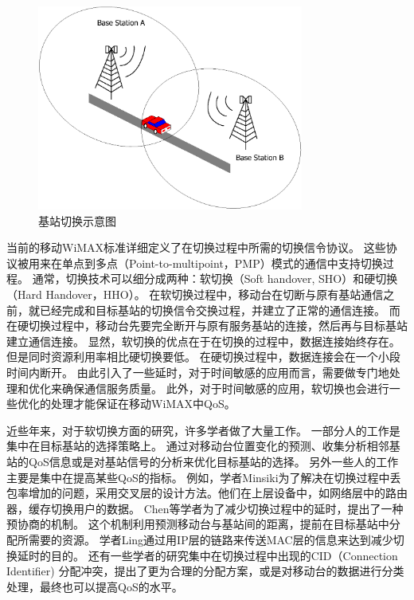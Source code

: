 \begin{figure}[t]
\begin{centering}
\includegraphics[height=6.75cm]{../figures/iccs_handover_bs}
\caption{基站切换示意图}
\label{fig:chap_iccs_handover_bs}
\end{centering}
\end{figure}

当前的移动WiMAX标准详细定义了在切换过程中所需的切换信令协议。
这些协议被用来在单点到多点（Point-to-multipoint，PMP）模式的通信中支持切换过程。
通常，切换技术可以细分成两种：软切换（Soft handover, SHO）和硬切换（Hard Handover，HHO）。
在软切换过程中，移动台在切断与原有基站通信之前，就已经完成和目标基站的切换信令交换过程，并建立了正常的通信连接。
而在硬切换过程中，移动台先要完全断开与原有服务基站的连接，然后再与目标基站建立通信连接。
显然，软切换的优点在于在切换的过程中，数据连接始终存在。
但是同时资源利用率相比硬切换要低。
在硬切换过程中，数据连接会在一个小段时间内断开。
由此引入了一些延时，对于时间敏感的应用而言，需要做专门地处理和优化来确保通信服务质量。
此外，对于时间敏感的应用，软切换也会进行一些优化的处理才能保证在移动WiMAX中QoS。


近些年来，对于软切换方面的研究，许多学者做了大量工作。
一部分人的工作是集中在目标基站的选择策略上。
通过对移动台位置变化的预测、收集分析相邻基站的QoS信息或是对基站信号的分析来优化目标基站的选择\cite{Hsieh:INFOCOM2003}\cite{DooHwan:WPC2006}。
另外一些人的工作主要是集中在提高某些QoS的指标。
例如，学者Minsiki为了解决在切换过程中丢包率增加的问题，采用交叉层的设计方法。他们在上层设备中，如网络层中的路由器，缓存切换用户的数据\cite{MinsikICACT2006}。
Chen等学者为了减少切换过程中的延时，提出了一种预协商的机制。
这个机制利用预测移动台与基站间的距离，提前在目标基站中分配所需要的资源\cite{JenHui:AUSWIRELESS:2007}。
学者Ling通过用IP层的链路来传送MAC层的信息来达到减少切换延时的目的\cite{LingVTC2007}。
还有一些学者的研究集中在切换过程中出现的CID（Connection Identifier) 分配冲突，提出了更为合理的分配方案，或是对移动台的数据进行分类处理，最终也可以提高QoS的水平\cite{Hu:TVT2004}\cite{Wenhua:ICC2007}。


